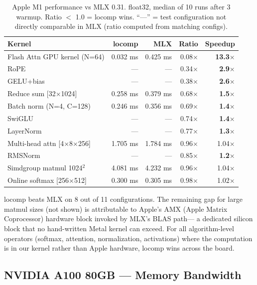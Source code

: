 \documentclass[10pt,twocolumn]{article}
\begin{document}
\begin{table}[H]
\centering
\footnotesize
\begin{tabular}{@{}lrrrr@{}}
\toprule
\textbf{Kernel} & \textbf{locomp} & \textbf{MLX} & \textbf{Ratio} & \textbf{Speedup} \\
\midrule
Flash Attn GPU kernel (N=64) & 0.032 ms & 0.425 ms & 0.08$\times$ & \textbf{13.3$\times$} \\
RoPE & --- & --- & 0.34$\times$ & \textbf{2.9$\times$} \\
GELU+bias & --- & --- & 0.38$\times$ & \textbf{2.6$\times$} \\
Reduce sum [32$\times$1024] & 0.258 ms & 0.379 ms & 0.68$\times$ & \textbf{1.5$\times$} \\
Batch norm (N=4, C=128) & 0.246 ms & 0.356 ms & 0.69$\times$ & \textbf{1.4$\times$} \\
SwiGLU & --- & --- & 0.74$\times$ & \textbf{1.4$\times$} \\
LayerNorm & --- & --- & 0.77$\times$ & \textbf{1.3$\times$} \\
Multi-head attn [4$\times$8$\times$256] & 1.705 ms & 1.784 ms & 0.96$\times$ & 1.04$\times$ \\
RMSNorm & --- & --- & 0.85$\times$ & \textbf{1.2$\times$} \\
Simdgroup matmul 1024$^2$ & 4.081 ms & 4.232 ms & 0.96$\times$ & 1.04$\times$ \\
Online softmax [256$\times$512] & 0.300 ms & 0.305 ms & 0.98$\times$ & 1.02$\times$ \\
\bottomrule
\end{tabular}
\caption{Apple M1 performance vs MLX 0.31. float32, median of 10 runs after 3
warmup. Ratio $<$ 1.0 = locomp wins. ``---'' = test configuration not
directly comparable in MLX (ratio computed from matching configs).}
\label{tab:m1}
\end{table}

locomp beats MLX on 8 out of 11 configurations. The remaining gap for large
matmul sizes (not shown) is attributable to Apple's AMX (Apple Matrix
Coprocessor) hardware block invoked by MLX's BLAS path---
a dedicated silicon block that no hand-written Metal kernel can exceed.
For all algorithm-level operators (softmax, attention, normalization,
activations) where the computation is in our kernel rather than Apple hardware,
locomp wins across the board.

\subsection{NVIDIA A100 80GB --- Memory Bandwidth}
\end{document}
